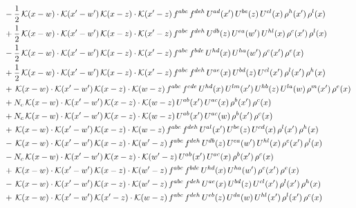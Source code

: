 \documentclass[9pt]{article}
\numberwithin{equation}{section}
\begin{document}
\begin{align}
& -\frac{1}{2}\,\mathcal{K}(x-w)\cdot\mathcal{K}(x'-w')\,\mathcal{K}(x-z)\cdot\mathcal{K}(x'-z)\,f^{abc}\,f^{deh}\,U^{ad}(x')\,U^{be}(z)\,U^{cl}(x)\,\rho^{h}(x')\,\rho^{l}(x)\notag\\
& +\frac{1}{2}\,\mathcal{K}(x-w)\cdot\mathcal{K}(x'-w')\,\mathcal{K}(x-z)\cdot\mathcal{K}(x'-z)\,f^{abc}\,f^{deh}\,U^{db}(z)\,U^{ea}(w')\,U^{hl}(x)\,\rho^{c}(x')\,\rho^{l}(x)\notag\\
& -\frac{1}{2}\,\mathcal{K}(x-w)\cdot\mathcal{K}(x'-w')\,\mathcal{K}(x-z)\cdot\mathcal{K}(x'-z)\,f^{abc}\,f^{bde}\,U^{hd}(x)\,U^{ha}(w')\,\rho^{c}(x')\,\rho^{e}(x)\notag\\
& +\frac{1}{2}\,\mathcal{K}(x-w)\cdot\mathcal{K}(x'-w')\,\mathcal{K}(x-z)\cdot\mathcal{K}(x'-z)\,f^{abc}\,f^{deh}\,U^{ae}(x)\,U^{bd}(z)\,U^{cl}(x')\,\rho^{l}(x')\,\rho^{h}(x)\notag\\
& +\,\mathcal{K}(x-w)\cdot\mathcal{K}(x'-w')\,\mathcal{K}(x-z)\cdot\mathcal{K}(w-z)\,f^{abc}\,f^{cde}\,U^{hd}(x)\,U^{lm}(x')\,U^{hb}(z)\,U^{la}(w)\,\rho^{m}(x')\,\rho^{e}(x)\notag\\
& +N_{c}\,\mathcal{K}(x-w)\cdot\mathcal{K}(x'-w')\,\mathcal{K}(x-z)\cdot\mathcal{K}(w-z)\,U^{ab}(x')\,U^{ac}(x)\,\rho^{b}(x')\,\rho^{c}(x)\notag\\
& +N_{c}\,\mathcal{K}(x-w)\cdot\mathcal{K}(x'-w')\,\mathcal{K}(x-z)\cdot\mathcal{K}(w-z)\,U^{ab}(x')\,U^{ac}(w)\,\rho^{b}(x')\,\rho^{c}(x)\notag\\
& +\,\mathcal{K}(x-w)\cdot\mathcal{K}(x'-w')\,\mathcal{K}(x-z)\cdot\mathcal{K}(w-z)\,f^{abc}\,f^{deh}\,U^{al}(x')\,U^{be}(z)\,U^{cd}(x)\,\rho^{l}(x')\,\rho^{h}(x)\notag\\
& -\,\mathcal{K}(x-w)\cdot\mathcal{K}(x'-w')\,\mathcal{K}(x-z)\cdot\mathcal{K}(w'-z)\,f^{abc}\,f^{deh}\,U^{db}(z)\,U^{ea}(w')\,U^{hl}(x)\,\rho^{c}(x')\,\rho^{l}(x)\notag\\
& -N_{c}\,\mathcal{K}(x-w)\cdot\mathcal{K}(x'-w')\,\mathcal{K}(x-z)\cdot\mathcal{K}(w'-z)\,U^{ab}(x')\,U^{ac}(x)\,\rho^{b}(x')\,\rho^{c}(x)\notag\\
& +\,\mathcal{K}(x-w)\cdot\mathcal{K}(x'-w')\,\mathcal{K}(x-z)\cdot\mathcal{K}(w'-z)\,f^{abc}\,f^{bde}\,U^{hd}(x)\,U^{ha}(w')\,\rho^{c}(x')\,\rho^{e}(x)\notag\\
& -\,\mathcal{K}(x-w)\cdot\mathcal{K}(x'-w')\,\mathcal{K}(x-z)\cdot\mathcal{K}(w'-z)\,f^{abc}\,f^{deh}\,U^{ae}(x)\,U^{bd}(z)\,U^{cl}(x')\,\rho^{l}(x')\,\rho^{h}(x)\notag\\
& +\,\mathcal{K}(x-w)\cdot\mathcal{K}(x'-w')\,\mathcal{K}(x'-z)\cdot\mathcal{K}(w-z)\,f^{abc}\,f^{deh}\,U^{eb}(z)\,U^{da}(w)\,U^{hl}(x')\,\rho^{l}(x')\,\rho^{c}(x)\notag\\

\end{align}
\end{document}
